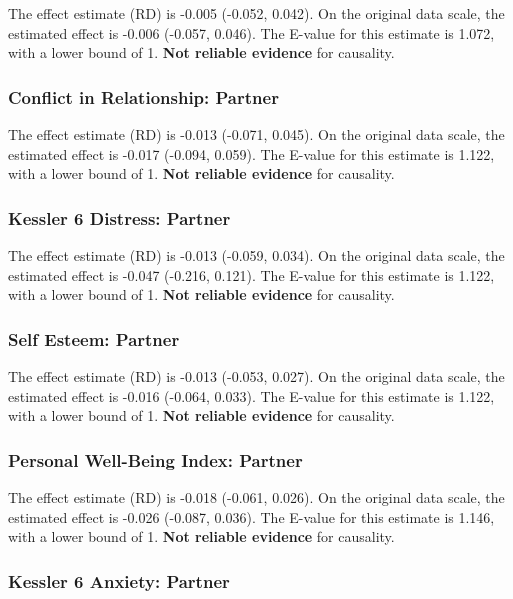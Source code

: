 \documentclass[
  singlecolumn]{article}
\begin{document}
The effect estimate (RD) is -0.005 (-0.052, 0.042). On the original data
scale, the estimated effect is -0.006 (-0.057, 0.046). The E-value for
this estimate is 1.072, with a lower bound of 1. \textbf{Not reliable
evidence} for causality.

\subsubsection{Conflict in Relationship:
Partner}\label{conflict-in-relationship-partner-8}

The effect estimate (RD) is -0.013 (-0.071, 0.045). On the original data
scale, the estimated effect is -0.017 (-0.094, 0.059). The E-value for
this estimate is 1.122, with a lower bound of 1. \textbf{Not reliable
evidence} for causality.

\subsubsection{Kessler 6 Distress:
Partner}\label{kessler-6-distress-partner-8}

The effect estimate (RD) is -0.013 (-0.059, 0.034). On the original data
scale, the estimated effect is -0.047 (-0.216, 0.121). The E-value for
this estimate is 1.122, with a lower bound of 1. \textbf{Not reliable
evidence} for causality.

\subsubsection{Self Esteem: Partner}\label{self-esteem-partner-8}

The effect estimate (RD) is -0.013 (-0.053, 0.027). On the original data
scale, the estimated effect is -0.016 (-0.064, 0.033). The E-value for
this estimate is 1.122, with a lower bound of 1. \textbf{Not reliable
evidence} for causality.

\subsubsection{Personal Well-Being Index:
Partner}\label{personal-well-being-index-partner-8}

The effect estimate (RD) is -0.018 (-0.061, 0.026). On the original data
scale, the estimated effect is -0.026 (-0.087, 0.036). The E-value for
this estimate is 1.146, with a lower bound of 1. \textbf{Not reliable
evidence} for causality.

\subsubsection{Kessler 6 Anxiety:
Partner}\label{kessler-6-anxiety-partner-8}
\end{document}

